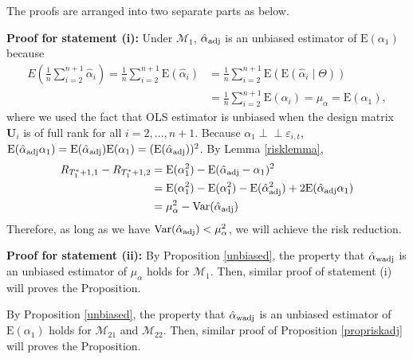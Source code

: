 \documentclass[11pt]{article}
\def\mbf#1{\mathbf{#1}} %
\newcommand{\indep}{\perp \!\!\! \perp } %
\def\mc#1{\mathcal{#1}} %
\def\E#1{\mathrm{E}(#1)} %
\def\var#1{\mathrm{Var}(#1)} %
\theoremstyle{definition}
\newenvironment{proof-of-proposition}[1][{}]{\noindent{\bf
    Proof of Proposition {#1}}
  \hspace*{.5em}}{\qed\bigskip\\}
\begin{document}
\begin{proof-of-proposition}[\ref{proprisk}] The proofs are arranged into two separate parts as below.

 \textbf{Proof for statement (i):} Under $\mc{M}_1$, $\hat{\alpha}_{\rm adj}$ is an unbiased estimator of $\E{\alpha_1}$ because
  \begin{align*}
   E\left( \frac{1}{n}\sum_{i=2}^{n+1} \hat{\alpha}_i\right)
   = \frac{1}{n}\sum_{i=2}^{n+1}\E{\hat{\alpha}_i}
   &= \frac{1}{n}\sum_{i=2}^{n+1}\E{\E{\hat{\alpha}_i\mid \Theta}}\\
   &=  \frac{1}{n}\sum_{i=2}^{n+1}\E{\alpha_i}
   = \mu_{\alpha}=\E{\alpha_1},
  \end{align*}
  where we used the fact that OLS estimator is unbiased when the design matrix $\mbf{U}_i$ is of full rank for all $i = 2, \ldots, n+1$. Because $\alpha_1\indep \varepsilon_{i,t}$, $\E{\hat{\alpha}_{\rm adj}\alpha_1}=\E{\hat{\alpha}_{\rm adj}}\E{\alpha_1}=(\E{\hat{\alpha}_{\rm adj}})^2$. By Lemma \ref{risklemma}, 
    \begin{align*}
    R_{T_1^*+1,1}-R_{T_1^*+1,2}
    &=\E{\alpha_1^2}-\E{\hat{\alpha}_{\rm adj}-\alpha_1}^2\\
   & =\E{\alpha_1^2}-\E{\alpha_1^2}- \E{\hat{\alpha}_{\rm adj}^2}+2\E{\hat{\alpha}_{\rm adj}\alpha_1} \\
   &= \mu_{\alpha}^2 - \var{\hat{\alpha}_{\rm adj}} 
  \end{align*}
  Therefore, as long as we have $\var{\hat{\alpha}_{\rm adj}}<\mu_{\alpha}^2$, we will achieve the risk reduction. 

 \textbf{Proof for statement (ii):} By Proposition \ref{unbiased}, the property that $\hat{\alpha}_{\rm wadj}$ is an unbiased estimator of $\mu_{\alpha}$ holds for $\mc{M}_{1}$. Then, similar proof of statement (i) will proves the Proposition.
\end{proof-of-proposition}



\begin{proof-of-proposition}[\ref{propriskwadj2}]
  By Proposition \ref{unbiased}, the property that $\hat{\alpha}_{\rm wadj}$ is an unbiased estimator of $\E{\alpha_1}$ holds for $\mc{M}_{21}$ and $\mc{M}_{22}$. Then, similar proof of Proposition \ref{propriskadj} will proves the Proposition.
\end{proof-of-proposition}






\end{document}
